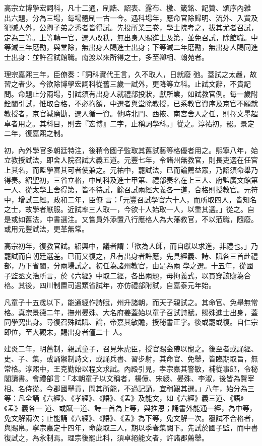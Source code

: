 \begin{pinyinscope}
 高宗立博學宏詞科，凡十二通，制誥、詔表、露布、檄、箴銘、記贊、頌序內雜
 出六題，分為三場，每場體制一古一今。遇科場年，應命官除歸明、流外、入貲及犯贓人外，公卿子弟之秀者皆得試。先投所業三卷，學士院考之，拔其尤者召試，定為三等。上等轉一官，選人改秩，無出身人賜進士及第，並免召試，除館職。中等減三年磨勘，與堂除，無出身人賜進士出身；下等減二年磨勘，無出身人賜同進士出身：並許召試館職。南渡以來所得之士，多至卿相、翰苑者。



 理宗嘉熙三年，臣僚奏：「詞科實代王言，久不取人，日就廢
 弛。蓋試之太嚴，故習之者少。今欲除博學宏詞科從舊三歲一試外，更降等立科。止試文辭，不貴記問。命題止分兩場，引試須有出身人就禮部投狀，獻所業，如試教官例。每一歲附銓闈引試，惟取合格，不必拘額，中選者與堂除教授，已系教官資序及京官不願就教授者，京官減磨勘，選人循一資。他時北門、西掖、南宮舍人之任，則擇文墨超卓者用之。其科目，則去『宏博』二字，止稱詞學科。」從之。淳祐初，罷。景定二年，復嘉熙之制。



 初，內外學官多朝廷特注，後稍令國子監取其舊試藝等格優者用之。熙寧八年，始立教授試法，即舍人院召試大義五道。元豐七年，令諸州無教官，則長吏選在任官上其名，而監學審其可者使兼之。元祐中，罷試法，已而論薦益眾，乃詔須命舉乃得奏。紹聖初，三省立格，中制科及進士甲第、禮部奏名在上三人、府監廣文館第一人、從太學上舍得第，皆不待試，餘召試兩經大義各一道，合格則授教官。元符中，增試三經。政和二年，臣僚
 言：「元豐召試學官六十人，而所取四人，皆知名之士，故學者厭服。近試率三人取一，今欲十人始取一人，以重其選。」從之。自是或如舊法，中書選注。又嘗員外添置八行應格人為大藩教官，不以蒞職，隨廢。或用元豐試法，更革無常。



 高宗初年，復教官試。紹興中，議者謂：「欲為人師，而自獻以求進，非禮也。」乃罷試而自朝廷選差。已而又復之，凡有出身者許應，先具經義、詩、賦各三首赴禮部，乃下省闈，分兩場試之。初任為諸州教官，由是為兩
 學之選。十五年，從國子監丞文浩所言，於《六經》中取二經，各出兩題，毋拘義式，以貫穿該贍為合格。其後，四川制置司遇類省試年，亦仿禮部附試，自嘉泰元年始。



 凡童子十五歲以下，能通經作詩賦，州升諸朝，而天子親試之。其命官、免舉無常格。真宗景德二年，撫州晏殊、大名府姜蓋始以童子召試詩賦，賜殊進士出身，蓋同學究出身。尋復召殊試賦、論，帝嘉其敏贍，授秘書正字。後或罷或復。自仁宗即位，至大觀末，賜出身者僅二十
 人。



 建炎二年，明舊制，親試童子，召見朱虎臣，授官賜金帶以寵之。後至者或誦經、史、子、集，或誦禦制詩文，或誦兵書、習步射，其命官、免舉，皆臨期取旨，無常格。淳熙中，王克勤始以程文求試。內殿引見，孝宗嘉其警敏，補從事郎，令秘閣讀書。會禮部言：「本朝童子以文稱者，楊億、宋綬、晏殊、李淑，後皆為賢宰相、名侍從。今郡國舉貢，問其所能，不過記誦，宜稍艱其選。」八年，始分為三等：凡全誦《六經》、《孝經》、《語》、《孟》及能文，如《六經》義三道、《語》《孟》義各一
 道、或賦一道、詩一首為上等，與推恩；誦書外能通一經，為中等，免文解兩次；止能誦《六經》、《語》、《孟》為下等，免文解一次。覆試不合格者，與賜帛。寧宗嘉定十四年，命歲取三人，期以季春集闕下。先試於國子監，而中書復試之，為永制焉。理宗後罷此科，須卓絕能文者，許諸郡薦舉。




\end{pinyinscope}
